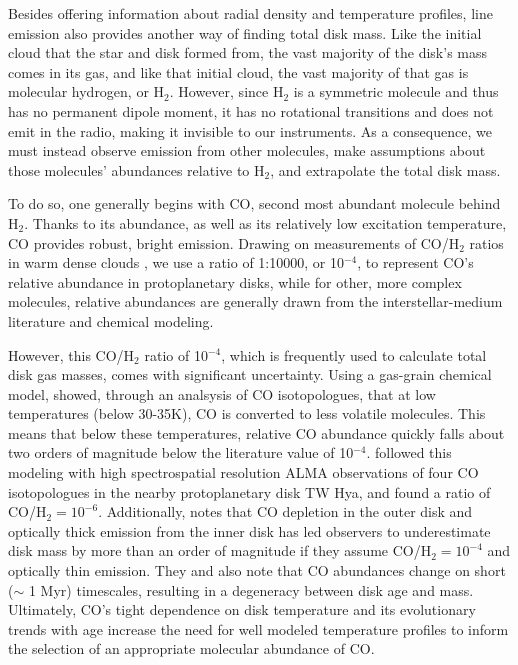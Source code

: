 Besides offering information about radial density and temperature profiles, line emission also provides another way of finding total disk mass. Like the initial cloud that the star and disk formed from, the vast majority of the disk's mass comes in its gas, and like that initial cloud, the vast majority of that gas is molecular hydrogen, or H$_2$. However, since H$_2$ is a symmetric molecule and thus has no permanent dipole moment, it has no rotational transitions and does not emit in the radio, making it invisible to our instruments. As a consequence, we must instead observe emission from other molecules, make assumptions about those molecules' abundances relative to H$_2$, and extrapolate the total disk mass.


To do so, one generally begins with CO, second most abundant molecule behind H$_2$. Thanks to its abundance, as well as its relatively low excitation temperature, CO provides robust, bright emission. Drawing on measurements of CO/H$_2$ ratios in warm dense clouds \citep{AikawaHerbst1999a,Fogel2011}, we use a ratio of 1:10000, or 10$^{-4}$, to represent CO's relative abundance in protoplanetary disks, while for other, more complex molecules, relative abundances are generally drawn from the interstellar-medium literature and chemical modeling.

However, this CO/H$_2$ ratio of 10$^{-4}$, which is frequently used to calculate total disk gas masses, comes with significant uncertainty. Using a gas-grain chemical model, \citet{Reboussin2015} showed, through an analsysis of CO isotopologues, that at low temperatures (below 30-35K), CO is converted to less volatile molecules. This means that below these temperatures, relative CO abundance quickly falls about two orders of magnitude below the literature value of 10$^{-4}$. \citet{Schwarz2016} followed this modeling with high spectrospatial resolution ALMA observations of four CO isotopologues in the nearby protoplanetary disk TW Hya, and found a ratio of CO/H$_2 = 10^{-6}$. Additionally, \cite{Yu2017} notes that CO depletion in the outer disk and optically thick emission from the inner disk has led observers \citep[e.g.][who found surprisingly low disk masses in their survey of ONC proplyds]{Ansdell2017} to underestimate disk mass by more than an order of magnitude if they assume CO/H$_2 = 10^{-4}$ and optically thin emission. They and \cite{Cleeves2015} also note that CO abundances change on short ($\sim$ 1 Myr) timescales, resulting in a degeneracy between disk age and mass. Ultimately, CO's tight dependence on disk temperature and its evolutionary trends with age increase the need for well modeled temperature profiles to inform the selection of an appropriate molecular abundance of CO.



